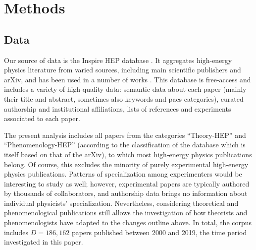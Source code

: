 \documentclass{article}
\begin{document}





\section{\label{sec:methods}Methods}

\subsection{\label{sec:data}Data}

Our source of data is the Inspire HEP database \citep{InspireAPI}. It aggregates high-energy physics literature from varied sources, including main scientific publishers and arXiv, and has been used in a number of works \citep{Perovi2016,Chall2019a,Strumia2021,Sikimi2022,Gautheron2023}. This database is free-access and includes a variety of high-quality data: semantic data about each paper (mainly their title and abstract, sometimes also keywords and \gls{pacs} categories), curated authorship and institutional affiliations, lists of references and experiments associated to each paper. %

The present analysis includes all papers from the categories ``Theory-HEP'' and ``Phenomenology-HEP'' (according to the classification of the database which is itself based on that of the arXiv), to which most  high-energy physics publications belong. Of course, this excludes the minority of purely experimental high-energy physics publications. Patterns of specialization among experimenters would be interesting to study as well; however, experimental papers are typically authored by thousands of collaborators, and authorship data brings no information about individual physicists' specialization. Nevertheless, considering theoretical and phenomenological publications still allows the investigation of how theorists and phenomenologists have adapted to the changes outline above. In total, the corpus includes $D=186,162$ papers published between 2000 and 2019, the time period investigated in this paper.
\end{document}
